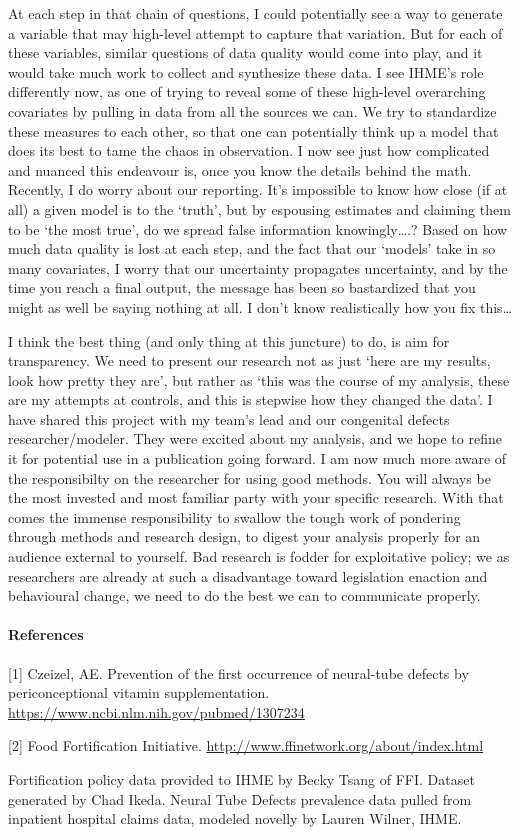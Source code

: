\documentclass[]{article}
\let\oldparagraph\paragraph
\renewcommand{\paragraph}[1]{\oldparagraph{#1}\mbox{}}
\begin{document}
At each step in that chain of questions, I could potentially see a way
to generate a variable that may high-level attempt to capture that
variation. But for each of these variables, similar questions of data
quality would come into play, and it would take much work to collect and
synthesize these data. I see IHME's role differently now, as one of
trying to reveal some of these high-level overarching covariates by
pulling in data from all the sources we can. We try to standardize these
measures to each other, so that one can potentially think up a model
that does its best to tame the chaos in observation. I now see just how
complicated and nuanced this endeavour is, once you know the details
behind the math. Recently, I do worry about our reporting. It's
impossible to know how close (if at all) a given model is to the
`truth', but by espousing estimates and claiming them to be `the most
true', do we spread false information knowingly\ldots{}.? Based on how
much data quality is lost at each step, and the fact that our `models'
take in so many covariates, I worry that our uncertainty propagates
uncertainty, and by the time you reach a final output, the message has
been so bastardized that you might as well be saying nothing at all. I
don't know realistically how you fix this\ldots{}

I think the best thing (and only thing at this juncture) to do, is aim
for transparency. We need to present our research not as just `here are
my results, look how pretty they are', but rather as `this was the
course of my analysis, these are my attempts at controls, and this is
stepwise how they changed the data'. I have shared this project with my
team's lead and our congenital defects researcher/modeler. They were
excited about my analysis, and we hope to refine it for potential use in
a publication going forward. I am now much more aware of the
responsibilty on the researcher for using good methods. You will always
be the most invested and most familiar party with your specific
research. With that comes the immense responsibility to swallow the
tough work of pondering through methods and research design, to digest
your analysis properly for an audience external to yourself. Bad
research is fodder for exploitative policy; we as researchers are
already at such a disadvantage toward legislation enaction and
behavioural change, we need to do the best we can to communicate
properly.

\paragraph{References}\label{references}

{[}1{]} Czeizel, AE. Prevention of the first occurrence of neural-tube
defects by periconceptional vitamin supplementation.
\url{https://www.ncbi.nlm.nih.gov/pubmed/1307234}

{[}2{]} Food Fortification Initiative.
\url{http://www.ffinetwork.org/about/index.html}

Fortification policy data provided to IHME by Becky Tsang of FFI.
Dataset generated by Chad Ikeda. Neural Tube Defects prevalence data
pulled from inpatient hospital claims data, modeled novelly by Lauren
Wilner, IHME.
\end{document}

